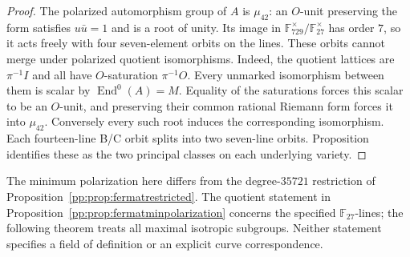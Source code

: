 \begin{proof}
The polarized automorphism group of $A$ is $\mu_{42}$:
an $O$-unit preserving the form satisfies $u\bar u=1$ and is a
root of unity. Its image in
$\mathbb F_{729}^\times/\mathbb F_{27}^\times$ has order $7$,
so it acts freely with four seven-element orbits on the lines.
These orbits cannot merge under polarized quotient isomorphisms.
Indeed, the quotient lattices are $\pi^{-1}I$ and all have
$O$-saturation $\pi^{-1}O$. Every unmarked isomorphism between
them is scalar by $\operatorname{End}^0(A)=M$. Equality of the
saturations forces this scalar to be an $O$-unit, and preserving
their common rational Riemann form forces it into $\mu_{42}$.
Conversely every such root induces the corresponding isomorphism.
Each fourteen-line B/C orbit splits into two seven-line orbits.
Proposition~ identifies these as
the two principal classes on each underlying variety.
\end{proof}

The minimum polarization here differs from the degree-$35721$
restriction of Proposition~\ref{pp:prop:fermatrestricted}.
The quotient statement in Proposition~\ref{pp:prop:fermatminpolarization}
concerns the specified $\mathbb F_{27}$-lines; the
following theorem treats all maximal isotropic subgroups. Neither
statement specifies a field of definition or an explicit curve correspondence.


